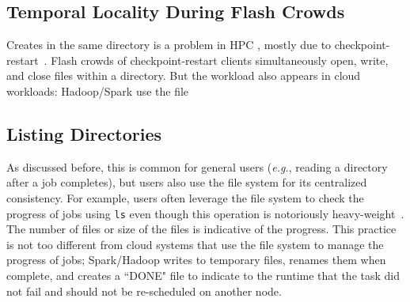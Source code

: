 \subsection{Temporal Locality During Flash Crowds}
\label{sec:temporal-locality-during-flash-crowds}

Creates in the same directory is a problem in HPC , mostly due to
checkpoint-restart~\cite{bent_plfs_2009}. Flash crowds of checkpoint-restart
clients simultaneously open, write, and close files within a directory.  But
the workload also appears in cloud workloads: Hadoop/Spark use the file
  

\subsection{Listing Directories}
\label{sec:listing-directories}

As discussed before, this is common for general users ({\it e.g.}, reading a
directory after a job completes), but users also use the file system for its
centralized consistency.  For example, users often leverage the file system to
check the progress of jobs using \texttt{ls} even though this operation is
notoriously heavy-weight~\cite{carns:ipdps09-pvfs, eshel:fast10-panache}. The
number of files or size of the files is indicative of the progress. This
practice is not too different from cloud systems that use the file system to
manage the progress of jobs; Spark/Hadoop writes to temporary files, renames
them when complete, and creates a ``DONE" file to indicate to the runtime that
the task did not fail and should not be re-scheduled on another node.

